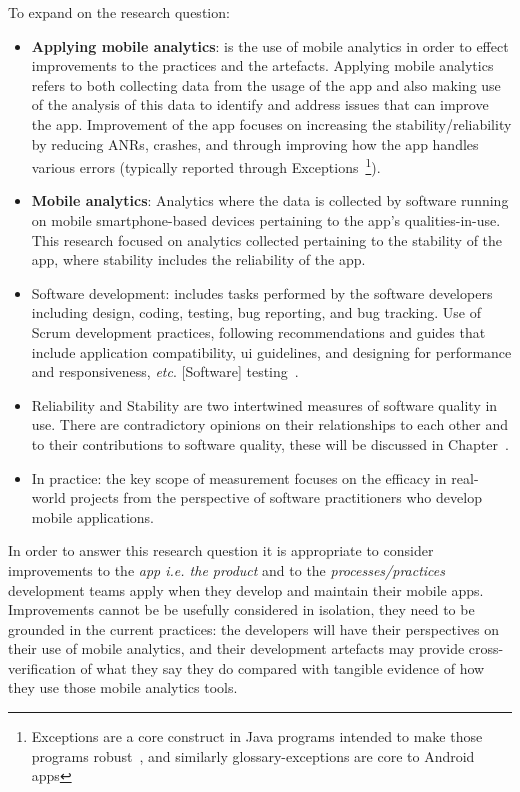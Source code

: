 To expand on the research question:
\begin{itemize}
    \item \textbf{Applying mobile analytics}: is the use of mobile analytics in order to effect improvements to the practices and the artefacts. Applying mobile analytics refers to both collecting data from the usage of the app and also making use of the analysis of this data to identify and address issues that can improve the app. Improvement of the app focuses on increasing the stability/reliability by reducing ANRs, crashes, and through improving how the app handles various errors (typically reported through Exceptions~\footnote{Exceptions are a core construct in Java programs intended to make those programs robust~\cite{robillard2000_designing_robust_java_programs_with_exceptions}, and similarly \glspl{glossary-exception} are core to Android apps}).
    \item \textbf{Mobile analytics}: Analytics where the data is collected by software running on mobile smartphone-based devices pertaining to the app's qualities-in-use. This research focused on analytics collected pertaining to the stability of the app, where stability includes the reliability of the app.
    \item Software development: includes tasks performed by the software developers including design, coding, testing, bug reporting, and bug tracking.  Use of Scrum development practices, following recommendations and guides that include application compatibility, \gls{ui} guidelines, and designing for performance and responsiveness, \emph{etc}. [Software] testing~.~
    \item Reliability and Stability are two intertwined measures of software quality in use. There are contradictory opinions on their relationships to each other and to their contributions to software quality, these will be discussed in Chapter~. 
    \item In practice: the key scope of measurement focuses on the efficacy in real-world projects from the perspective of software practitioners who develop mobile applications.
\end{itemize}

In order to answer this research question it is appropriate to consider improvements to the \emph{app i.e. the product} and to the \emph{processes/practices} development teams apply when they develop and maintain their mobile apps. Improvements cannot be be usefully considered in isolation, they need to be grounded in the current practices: the developers will have their perspectives on their use of mobile analytics, and their development artefacts may provide cross-verification of what they say they do compared with tangible evidence of how they use those mobile analytics tools. 


